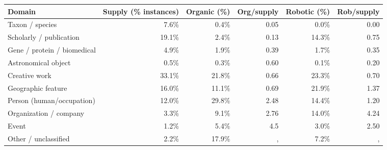 \documentclass[sw]{iosart2x}
\providecommand{\DIFaddbeginFL}{} %
\providecommand{\DIFaddendFL}{} %
\providecommand{\DIFdelendFL}{} %
\providecommand{\DIFaddincludegraphics}[2][]{{\color{blue}\fbox{\DIFOincludegraphics[#1]{#2}}}} %
\DeclareRobustCommand{\DIFaddbeginFL}{\DIFOaddbeginFL \let\includegraphics\DIFaddincludegraphics} %
\DeclareRobustCommand{\DIFaddendFL}{\DIFOaddendFL \let\includegraphics\DIFOincludegraphics} %
\DeclareRobustCommand{\DIFdelendFL}{\DIFOaddendFL \let\includegraphics\DIFOincludegraphics} %
\begin{document}
\begin{table}[ht]
\DIFdelendFL \DIFaddbeginFL \begin{tabular}{l|r|r|r|r|r}
\hline
Domain & Supply (\% instances) & Organic (\%) & Org/supply & Robotic (\%) & Rob/supply \\
\hline
Taxon / species              & 7.6\%  & 0.4\%  & 0.05 & 0.0\%  & 0.00 \\
Scholarly / publication      & 19.1\% & 2.4\%  & 0.13 & 14.3\% & 0.75 \\
Gene / protein / biomedical  & 4.9\%  & 1.9\%  & 0.39 & 1.7\%  & 0.35 \\
Astronomical object          & 0.5\%  & 0.3\%  & 0.60 & 0.1\%  & 0.20 \\
Creative work                & 33.1\% & 21.8\% & 0.66 & 23.3\% & 0.70 \\
Geographic feature           & 16.0\% & 11.1\% & 0.69 & 21.9\% & 1.37 \\
Person (human/occupation)    & 12.0\% & 29.8\% & 2.48 & 14.4\% & 1.20 \\
Organization / company       & 3.3\%  & 9.1\%  & 2.76 & 14.0\% & 4.24 \\
Event                        & 1.2\%  & 5.4\%  & 4.5  & 3.0\%  & 2.50 \\
Other / unclassified         & 2.2\%  & 17.9\% &, & 7.2\%  &, \\
\hline
\end{tabular}
\DIFaddendFL \end{table}
\end{document}
